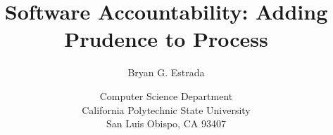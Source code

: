 \documentclass[12pt]{article}
\begin{document}
\title{Software Accountability: Adding Prudence to Process}
\author{Bryan G. Estrada}
\date{Computer Science Department \\
      California Polytechnic State University \\
      San Luis Obispo, CA  93407}

\maketitle\thispagestyle{empty}
\doublespace
\newpage
\tableofcontents
\listoffigures
\listoftables
\newpage
{}









\end{document}
